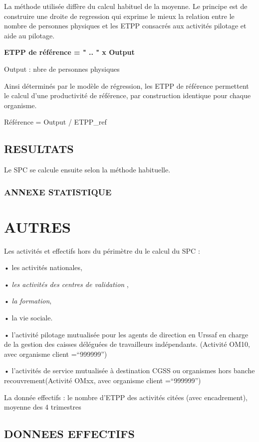\documentclass[
]{book}
\begin{document}
La méthode utilisée diffère du calcul habituel de la moyenne.
Le principe est de construire une droite de regression qui exprime le mieux la relation entre le nombre de personnes physiques et les ETPP consacrés aux activités pilotage et aide au pilotage.

\textbf{ETPP de référence = " .. " x Output }

Output : nbre de personnes physiques

Ainsi déterminés par le modèle de régression, les ETPP de référence permettent le calcul d'une productivité de référence, par construction identique pour chaque organisme.

Référence = Output / ETPP\_ref

\hypertarget{resultats}{%
\section{RESULTATS}\label{resultats}}

Le SPC se calcule ensuite selon la méthode habituelle.

\hypertarget{annexe-statistique}{%
\subsection{ANNEXE STATISTIQUE}\label{annexe-statistique}}

\hypertarget{autres}{%
\chapter{AUTRES}\label{autres}}

Les activités et effectifs hors du périmètre du le calcul du SPC :

• les activités nationales,

• \emph{les activités des centres de validation} ,

• \emph{la formation},

• la vie sociale.

• l'activité pilotage mutualisée pour les agents de direction en Urssaf en charge de la gestion des caisses déléguées de travailleurs indépendants. (Activité OM10, avec organisme client =``999999'')

• l'activités de service mutualisée à destination CGSS ou organismes hors banche recouvrement(Activité OMxx, avec organisme client =``999999'')

La donnée effectifs : le nombre d'ETPP des activités citées (avec encadrement), moyenne des 4 trimestres

\hypertarget{donnees-effectifs}{%
\section{DONNEES EFFECTIFS}\label{donnees-effectifs}}

  
\end{document}
